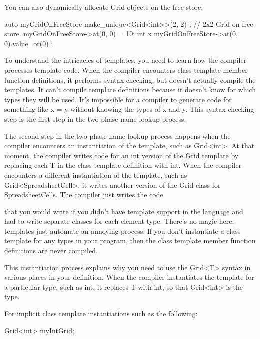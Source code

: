 You can also dynamically allocate Grid objects on the free store:

\begin{cpp}
auto myGridOnFreeStore { make_unique<Grid<int>>(2, 2) }; // 2x2 Grid on free store.
myGridOnFreeStore->at(0, 0) = 10;
int x { myGridOnFreeStore->at(0, 0).value_or(0) };
\end{cpp}



To understand the intricacies of templates, you need to learn how the compiler processes template code. When the compiler encounters class template member function definitions, it performs syntax checking, but doesn’t actually compile the templates. It can’t compile template definitions because it doesn’t know for which types they will be used. It’s impossible for a compiler to generate code for something like x = y without knowing the types of x and y. This syntax-checking step is the first step in the two-phase name lookup process.

The second step in the two-phase name lookup process happens when the compiler encounters an instantiation of the template, such as Grid<int>. At that moment, the compiler writes code for an int version of the Grid template by replacing each T in the class template definition with int. When the compiler encounters a different instantiation of the template, such as Grid<SpreadsheetCell>, it writes another version of the Grid class for SpreadsheetCells. The compiler just writes the code

that you would write if you didn’t have template support in the language and had to write separate classes for each element type. There’s no magic here; templates just automate an annoying process. If you don’t instantiate a class template for any types in your program, then the class template member function definitions are never compiled.

This instantiation process explains why you need to use the Grid<T> syntax in various places in your definition. When the compiler instantiates the template for a particular type, such as int, it replaces T with int, so that Grid<int> is the type.


For implicit class template instantiations such as the following:

\begin{cpp}
Grid<int> myIntGrid;
\end{cpp}

